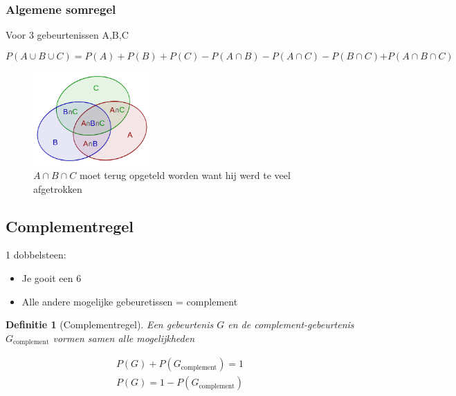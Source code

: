 \documentclass{article}
\newtheorem{theorem}{Definitie}[section]
\begin{document}
\subsubsection{Algemene somregel}

Voor 3 gebeurtenissen A,B,C

\begin{equation}
    P(A \cup B \cup C) = P(A) + P(B) + P(C) - P(A \cap B) - P(A \cap C) - P(B \cap C) \mathbf{+} P(A \cap B \cap C)
\end{equation}


\begin{figure}[H]
    \centering
    \includegraphics[width=0.4\textwidth]{algemene-somregel.png}
    \caption{$A \cap B \cap C$ moet terug opgeteld worden want hij werd te veel afgetrokken}
\end{figure}

\subsection{Complementregel}

1 dobbelsteen:

\begin{itemize}
    \item Je gooit een 6
    \item Alle andere mogelijke gebeuretissen = complement
\end{itemize}

\begin{theorem}[Complementregel]
    Een gebeurtenis $G$ en de complement-gebeurtenis $G_{\text{complement}}$ vormen samen alle mogelijkheden

    \begin{equation}
        \begin{aligned}
            P(G) + P(G_{\text{complement}}) = 1\\
            P(G) = 1 - P(G_{\text{complement}})
        \end{aligned}
    \end{equation}
\end{theorem}
\end{document}

